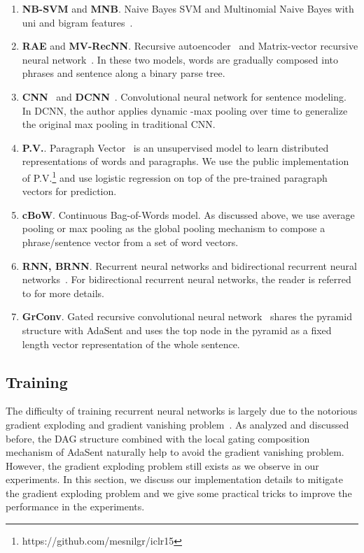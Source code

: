 \documentclass{article}
\theoremstyle{definition}
\begin{document}
\begin{enumerate}
	\item 	\textbf{NB-SVM} and \textbf{MNB}. Naive Bayes SVM and Multinomial Naive Bayes with uni and bigram features~\cite{wang2012baselines}. 
	\item 	\textbf{RAE} and \textbf{MV-RecNN}. Recursive autoencoder~\cite{socher2011semi} and Matrix-vector recursive neural network~\cite{socher2012semantic}. In these two models, words are gradually composed into phrases and sentence along a binary parse tree.
	\item 	\textbf{CNN}~\cite{kim2014convolutional} and \textbf{DCNN}~\cite{KalchbrennerACL2014}. Convolutional neural network for sentence modeling. In DCNN, the author applies dynamic -max pooling over time to generalize the original max pooling in traditional CNN.
	\item 	\textbf{P.V.}. Paragraph Vector~\cite{le2014distributed} is an unsupervised model to learn distributed representations of words and paragraphs. We use the public implementation of P.V.\footnote{https://github.com/mesnilgr/iclr15} and use logistic regression on top of the pre-trained paragraph vectors for prediction.
	\item	\textbf{cBoW}. Continuous Bag-of-Words model. As discussed above, we use average pooling or max pooling as the global pooling mechanism to compose a phrase/sentence vector from a set of word vectors.
	\item 	\textbf{RNN, BRNN}. Recurrent neural networks and bidirectional recurrent neural networks~\cite{schuster1997bidirectional}. 
For bidirectional recurrent neural networks, the reader is referred to \cite{lai2015recurrent} for more details.
	\item 	\textbf{GrConv}. Gated recursive convolutional neural network~\cite{cho2014properties} shares the pyramid structure with AdaSent and uses the top node in the pyramid as a fixed length vector representation of the whole sentence. 
\end{enumerate}

\subsection{Training}


The difficulty of training recurrent neural networks is largely due to the notorious gradient exploding and gradient vanishing problem~\cite{bengio1994learning,pascanu2013difficulty}. As analyzed and discussed before, the DAG structure combined with the local gating composition mechanism of AdaSent naturally help to avoid the gradient vanishing problem. However, the gradient exploding problem still exists as we observe in our experiments. In this section, we discuss our implementation details to mitigate the gradient exploding problem and we give some practical tricks to improve the performance in the experiments.
\end{document}
